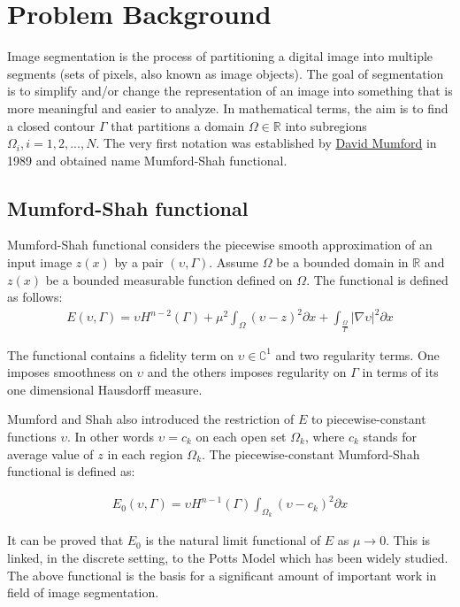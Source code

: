 \chapter{Problem Background}
\label{ch:problem_background}

Image segmentation \cite{Shapiro2001} is the process of partitioning a digital image into multiple segments (sets of pixels, also known as image objects). The goal of segmentation is to simplify and/or change the representation of an image into something that is more meaningful and easier to analyze. In mathematical terms, the aim is to find a closed contour $\Gamma$ that partitions a domain $\Omega \in \mathbb{R}$  into subregions $\Omega_i, i = 1, 2, ..., N$.
The very first notation was established by \href{https://en.wikipedia.org/wiki/David_Mumford}{\color{blue} David Mumford} in 1989 and obtained name \cite{Kim2020} Mumford-Shah functional.

\section{Mumford-Shah functional}
Mumford-Shah functional considers the piecewise smooth approximation of an input image $z(x)$ by a pair $(\upsilon, \Gamma)$. Assume $\Omega$ be a bounded domain in $\mathbb{R}$ and $z(x)$ be a bounded measurable function defined on $\Omega$. The functional is defined as follows:
\begin{align*}
 E (\upsilon, \Gamma) = \upsilon H^{n-2} (\Gamma) + \mu^2 \int_{\Omega} (\upsilon - z)^2 \partial x + \int_{\frac{\Omega}{\Gamma}} \lvert \nabla \upsilon \rvert^2 \partial x
 \end{align*}

The functional contains a fidelity term on $\upsilon \in \complement^1$ and two regularity terms. One
imposes smoothness on $\upsilon$ and the others imposes regularity on $\Gamma$ in terms of its one dimensional \cite{Buda1992} Hausdorff measure.

Mumford and Shah also introduced the restriction of $E$ to piecewise-constant functions $\upsilon$. In other words $\upsilon = c_k$ on each open set $\Omega_k$, where $c_k$ stands for average value of $z$ in each region $\Omega_k$. The piecewise-constant Mumford-Shah functional is defined as:

\begin{align*}
 E_0 (\upsilon, \Gamma) = \upsilon H^{n-1} (\Gamma) \int_{\Omega_k} (\upsilon - c_k)^2 \partial x
\end{align*}

It can be proved that $E_0$ is the natural limit functional of $E$ as $\mu \to 0$. This is linked, in the discrete setting, to the \cite{Wu1982} Potts Model which has been widely studied. The above functional is the basis for a significant amount of important work in field of image segmentation.